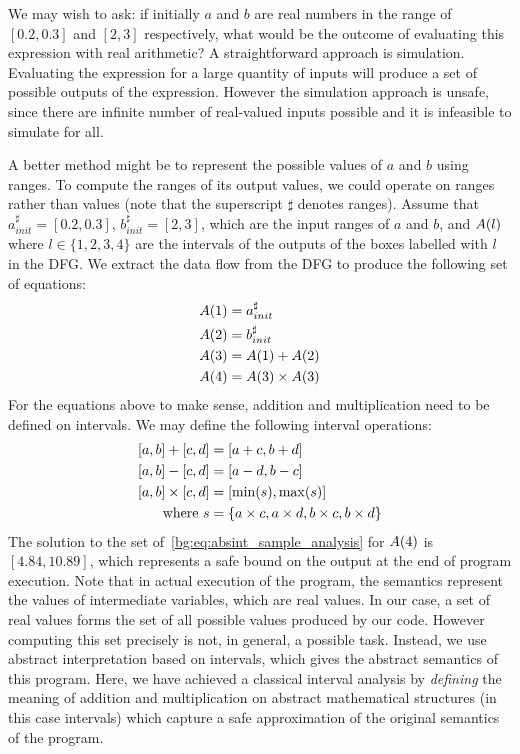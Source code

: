 We may wish to ask: if initially $a$ and $b$ are real numbers in the range of
$[0.2, 0.3]$ and $[2, 3]$ respectively, what would be the outcome of evaluating
this expression with real arithmetic? A straightforward approach is simulation.
Evaluating the expression for a large quantity of inputs will produce a set
of possible outputs of the expression. However the simulation approach is
unsafe, since there are infinite number of real-valued inputs possible and it
is infeasible to simulate for all.

A better method might be to represent the possible values of $a$ and $b$ using
ranges. To compute the ranges of its output values, we could operate on ranges
rather than values (note that the superscript $\sharp$ denotes ranges). Assume
that $a^\sharp_{init} = [0.2, 0.3]$, $b^\sharp_{init} = [2, 3]$, which are the
input ranges of $a$ and $b$, and $A({l})$ where $l \in \{1, 2, 3, 4\}$ are
the intervals of the outputs of the boxes labelled with $l$ in the DFG\@. We
extract the data flow from the DFG to produce the following set of equations:
\begin{equation}
    \begin{aligned}
        A({1}) &= a^\sharp_{init} \\
        A({2}) &= b^\sharp_{init} \\
        A({3}) &= A({1}) + A({2}) \\
        A({4}) &= A({3}) \times A({3})
    \end{aligned}
    \label{bg:eq:absint_sample_analysis}
\end{equation}
For the equations above to make sense, addition and multiplication need to be
defined on intervals. We may define the following interval operations:
\begin{equation}
    \begin{aligned}
        \left[{a}, {b}\right] + \left[{c}, {d}\right] &= \left[{a + c}, {b + d}\right] \\
        \left[{a}, {b}\right] - \left[{c}, {d}\right] &=  \left[{a - d}, {b - c}\right] \\
        \left[{a}, {b}\right] \times \left[{c}, {d}\right] &=
            \left[{\min(s)}, {\max(s)}\right] \\
        \text{where~} s &= \{ a \times c, a \times d, b \times c, b \times d \}
    \end{aligned}
    \label{bg:eq:interval_operations}
\end{equation}
The solution to the set of~\eqref{bg:eq:absint_sample_analysis} for $A({4})$
is $[4.84, 10.89]$, which represents a safe bound on the output at the end
of program execution. Note that in actual execution of the program, the
semantics represent the values of intermediate variables, which are real
values. In our case, a set of real values forms the set of all possible
values produced by our code. However computing this set precisely is not,
in general, a possible task. Instead, we use abstract interpretation based
on intervals, which gives the abstract semantics of this program. Here, we
have achieved a classical interval analysis by \emph{defining} the meaning of
addition and multiplication on abstract mathematical structures (in this case
intervals) which capture a safe approximation of the original semantics of the
program.

